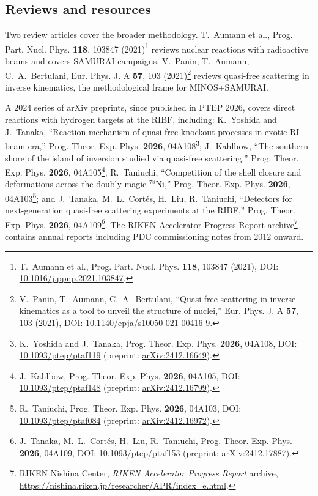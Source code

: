 \documentclass[a4paper, 11pt]{article}
\begin{document}
\subsection{Reviews and resources}
Two review articles cover the broader methodology. T.~Aumann et al., Prog. Part. Nucl. Phys. \textbf{118}, 103847 (2021)\footnote{\label{fn:aumann2021}T.~Aumann et al., Prog. Part. Nucl. Phys. \textbf{118}, 103847 (2021), DOI: \href{https://doi.org/10.1016/j.ppnp.2021.103847}{10.1016/j.ppnp.2021.103847}.} reviews nuclear reactions with radioactive beams and covers SAMURAI campaigns. V.~Panin, T.~Aumann, C.~A.~Bertulani, Eur. Phys. J. A \textbf{57}, 103 (2021)\footnote{\label{fn:panin2021}V.~Panin, T.~Aumann, C.~A.~Bertulani, ``Quasi-free scattering in inverse kinematics as a tool to unveil the structure of nuclei,'' Eur. Phys. J. A \textbf{57}, 103 (2021), DOI: \href{https://doi.org/10.1140/epja/s10050-021-00416-9}{10.1140/epja/s10050-021-00416-9}.} reviews quasi-free scattering in inverse kinematics, the methodological frame for MINOS+SAMURAI.

A 2024 series of arXiv preprints, since published in PTEP 2026, covers direct reactions with hydrogen targets at the RIBF, including: K.~Yoshida and J.~Tanaka, ``Reaction mechanism of quasi-free knockout processes in exotic RI beam era,'' Prog. Theor. Exp. Phys. \textbf{2026}, 04A108\footnote{\label{fn:yoshida2024}K.~Yoshida and J.~Tanaka, Prog. Theor. Exp. Phys. \textbf{2026}, 04A108, DOI: \href{https://doi.org/10.1093/ptep/ptaf119}{10.1093/ptep/ptaf119} (preprint: \href{https://arxiv.org/abs/2412.16649}{arXiv:2412.16649}).}; J.~Kahlbow, ``The southern shore of the island of inversion studied via quasi-free scattering,'' Prog. Theor. Exp. Phys. \textbf{2026}, 04A105\footnote{\label{fn:kahlbow2024arxiv}J.~Kahlbow, Prog. Theor. Exp. Phys. \textbf{2026}, 04A105, DOI: \href{https://doi.org/10.1093/ptep/ptaf148}{10.1093/ptep/ptaf148} (preprint: \href{https://arxiv.org/abs/2412.16799}{arXiv:2412.16799}).}; R.~Taniuchi, ``Competition of the shell closure and deformations across the doubly magic $^{78}$Ni,'' Prog. Theor. Exp. Phys. \textbf{2026}, 04A103\footnote{\label{fn:taniuchi2024}R.~Taniuchi, Prog. Theor. Exp. Phys. \textbf{2026}, 04A103, DOI: \href{https://doi.org/10.1093/ptep/ptaf084}{10.1093/ptep/ptaf084} (preprint: \href{https://arxiv.org/abs/2412.16972}{arXiv:2412.16972}).}; and J.~Tanaka, M.~L.~Cortés, H.~Liu, R.~Taniuchi, ``Detectors for next-generation quasi-free scattering experiments at the RIBF,'' Prog. Theor. Exp. Phys. \textbf{2026}, 04A109\footnote{\label{fn:tanaka2024}J.~Tanaka, M.~L.~Cortés, H.~Liu, R.~Taniuchi, Prog. Theor. Exp. Phys. \textbf{2026}, 04A109, DOI: \href{https://doi.org/10.1093/ptep/ptaf153}{10.1093/ptep/ptaf153} (preprint: \href{https://arxiv.org/abs/2412.17887}{arXiv:2412.17887}).}. The RIKEN Accelerator Progress Report archive\footnote{\label{fn:rikenapr}RIKEN Nishina Center, \emph{RIKEN Accelerator Progress Report} archive, \url{https://nishina.riken.jp/researcher/APR/index_e.html}.} contains annual reports including PDC commissioning notes from 2012 onward.
\end{document}
